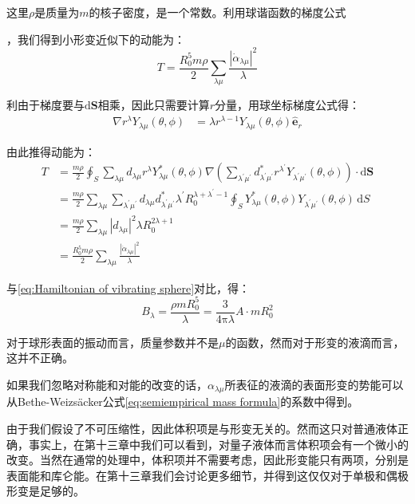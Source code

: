 这里$\rho$是质量为$m$的核子密度，是一个常数。利用球谐函数的梯度公式

，我们得到小形变近似下的动能为：
\begin{equation}
T=\frac{R^{5}_{0}m\rho}{2}\sum_{\lambda\mu}\frac{\left|\dot{\alpha}_{\lambda\mu}\right|^{2}}{\lambda}\label{eq:kinetic energy of little alpha}
\end{equation}

\begin{booknote*}
利由于梯度要与$\mathrm{d}\boldsymbol{S}$相乘，因此只需要计算$r$分量，用球坐标梯度公式得：
\begin{align*}
\nabla r^{\lambda}Y_{\lambda\mu}(\theta,\phi) & =\lambda r^{\lambda-1}Y_{\lambda\mu}(\theta,\phi)\hat{\boldsymbol{e}}_{r}
\end{align*}

由此推得动能为：
\begin{align*}
T & =\frac{m\rho}{2}\oint_{S}\sum_{\lambda\mu}d_{\lambda\mu}r^{\lambda}Y^{*}_{\lambda\mu}(\theta,\phi)\nabla\left(\sum_{\lambda^{\prime}\mu^{\prime}}d^{*}_{\lambda^{\prime}\mu^{\prime}}r^{\lambda^{\prime}}Y_{\lambda^{\prime}\mu^{\prime}}(\theta,\phi)\right)\cdot\mathrm{d}\boldsymbol{S}\\
 & =\frac{m\rho}{2}\sum_{\lambda\mu}\sum_{\lambda^{\prime}\mu^{\prime}}d_{\lambda\mu}d^{*}_{\lambda^{\prime}\mu^{\prime}}\lambda^{\prime}R^{\lambda+\lambda^{\prime}-1}_{0}\oint_{S}Y^{*}_{\lambda\mu}(\theta,\phi)Y_{\lambda^{\prime}\mu^{\prime}}(\theta,\phi)\,\mathrm{d}S\\
 & =\frac{m\rho}{2}\sum_{\lambda\mu}\left|d_{\lambda\mu}\right|^{2}\lambda R^{2\lambda+1}_{0}\\
 & =\frac{R^{5}_{0}m\rho}{2}\sum_{\lambda\mu}\frac{\left|\dot{\alpha}_{\lambda\mu}\right|^{2}}{\lambda}
\end{align*}
\end{booknote*}
与\ref{eq:Hamiltonian of vibrating sphere}对比，得：
\[
B_{\lambda}=\frac{\rho mR^{5}_{0}}{\lambda}=\frac{3}{4\mathrm{\pi}\lambda}A\cdot mR^{2}_{0}
\]

对于球形表面的振动而言，质量参数并不是$\mu$的函数，然而对于形变的液滴而言，这并不正确。

如果我们忽略对称能和对能的改变的话，$\alpha_{\lambda\mu}$所表征的液滴的表面形变的势能可以从Bethe-Weizs\"acker公式\ref{eq:semiempirical mass formula}的系数中得到。

由于我们假设了不可压缩性，因此体积项是与形变无关的。然而这只对普通液体正确，事实上，在第十三章中我们可以看到，对量子液体而言体积项会有一个微小的改变。当然在通常的处理中，体积项并不需要考虑，因此形变能只有两项，分别是表面能和库仑能。在第十三章我们会讨论更多细节，并得到这仅仅对于单极和偶极形变是足够的。

